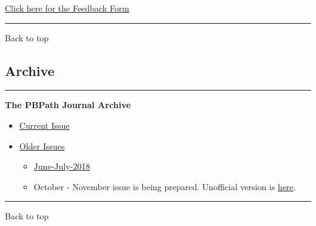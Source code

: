 \documentclass[]{article}
\begin{document}
\href{https://docs.google.com/forms/d/e/1FAIpQLSeD3Z9J6Y7eMmiyM12f_SfAmHUlykb1zxZcwO6lg7cebGYQIQ/viewform}{Click
here for the Feedback Form}

\begin{center}\rule{0.5\linewidth}{\linethickness}\end{center}

Back to top

\pagebreak

\hypertarget{archive}{%
\subsection{Archive}\label{archive}}

\begin{center}\rule{0.5\linewidth}{\linethickness}\end{center}

\textbf{The PBPath Journal Archive}

\begin{itemize}
\item
  \href{http://pbpath.org/journal-watch/}{Current Issue}
\item
  \href{http://pbpath.org/journal-watch-archive/}{Older Issues}

  \begin{itemize}
  \item
    \href{http://pbpath.org/pbpath-journal-watch-june-july-2018/}{June-July-2018}
  \item
    October - November issue is being prepared. Unofficial version is
    \href{http://pbpath.org/journal-watch-upcoming-issue/}{here}.
  \end{itemize}
\end{itemize}

\begin{center}\rule{0.5\linewidth}{\linethickness}\end{center}

Back to top
\end{document}
